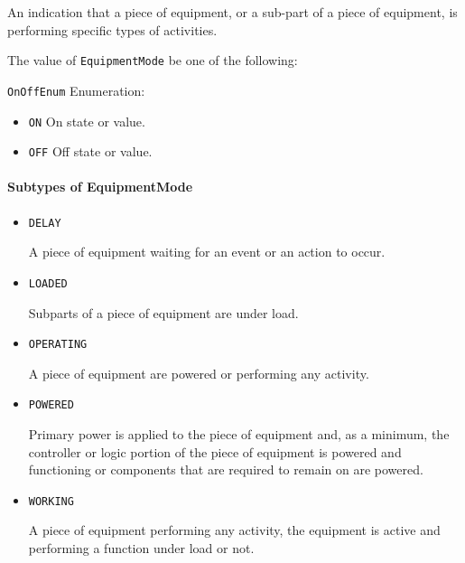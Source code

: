 An indication that a piece of equipment, or a sub-part of a piece of equipment, is performing specific types of activities.


The value of \texttt{EquipmentMode} \MUST be one of the following: 


\texttt{OnOffEnum} Enumeration:

\begin{itemize}
\item \texttt{ON} \newline On state or value. 
\item \texttt{OFF} \newline Off state or value. 
\end{itemize}


\paragraph{Subtypes of EquipmentMode}\mbox{}
\label{sec:Subtypes of EquipmentMode}

\begin{itemize}

\item \texttt{DELAY}


A piece of equipment waiting for an event or an action to occur.

\item \texttt{LOADED}


Subparts of a piece of equipment are under load.

\item \texttt{OPERATING}


A piece of equipment are powered or performing any activity.

\item \texttt{POWERED}


Primary  power is  applied  to the  piece  of  equipment and,  as  a minimum, the controller or logic portion of the piece of equipment is powered and functioning or components that are required to remain on are powered.

\item \texttt{WORKING}


A piece of equipment performing any activity, the equipment is active and performing a function under load or not.


\end{itemize}








